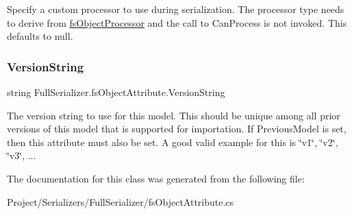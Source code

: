 Specify a custom processor to use during serialization. The processor type needs to derive from \hyperlink{class_full_serializer_1_1fs_object_processor}{fs\+Object\+Processor} and the call to Can\+Process is not invoked. This defaults to null. 

\mbox{\label{class_full_serializer_1_1fs_object_attribute_ac3208d9844485e25429cd4182d34111a}} 
\subsubsection{\texorpdfstring{Version\+String}{VersionString}}
{\footnotesize\ttfamily string Full\+Serializer.\+fs\+Object\+Attribute.\+Version\+String}



The version string to use for this model. This should be unique among all prior versions of this model that is supported for importation. If Previous\+Model is set, then this attribute must also be set. A good valid example for this is \char`\"{}v1\char`\"{}, \char`\"{}v2\char`\"{}, \char`\"{}v3\char`\"{}, ... 



The documentation for this class was generated from the following file\+:\begin{DoxyCompactItemize}
\item 
Project/\+Serializers/\+Full\+Serializer/fs\+Object\+Attribute.\+cs\end{DoxyCompactItemize}
